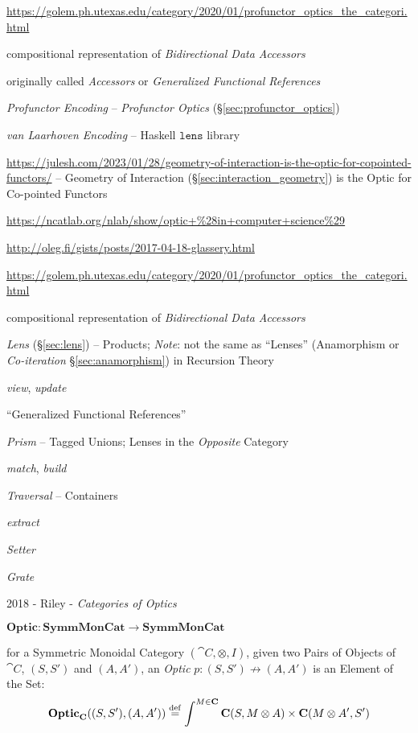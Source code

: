 
\url{https://golem.ph.utexas.edu/category/2020/01/profunctor_optics_the_categori.html}

compositional representation of \emph{Bidirectional Data Accessors}

originally called \emph{Accessors} or \emph{Generalized Functional References}

\emph{Profunctor Encoding} -- \emph{Profunctor Optics}
(\S\ref{sec:profunctor_optics})

\emph{van Laarhoven Encoding} -- Haskell $\mathtt{lens}$ library


\url{https://julesh.com/2023/01/28/geometry-of-interaction-is-the-optic-for-copointed-functors/}
-- Geometry of Interaction (\S\ref{sec:interaction_geometry}) is the Optic for
Co-pointed Functors

\url{https://ncatlab.org/nlab/show/optic+%28in+computer+science%29}

\url{http://oleg.fi/gists/posts/2017-04-18-glassery.html}

\url{https://golem.ph.utexas.edu/category/2020/01/profunctor_optics_the_categori.html}

compositional representation of \emph{Bidirectional Data Accessors}

\emph{Lens} (\S\ref{sec:lens}) -- Products; \emph{Note}: not the same as
``Lenses'' (Anamorphism or \emph{Co-iteration} \S\ref{sec:anamorphism}) in
Recursion Theory

\emph{view}, \emph{update}

``Generalized Functional References''

\emph{Prism} -- Tagged Unions; Lenses in the \emph{Opposite} Category

\emph{match}, \emph{build}

\emph{Traversal} -- Containers

\emph{extract}

\emph{Setter}

\emph{Grate}

2018 - Riley - \emph{Categories of Optics}

$\mathbf{Optic} : \mathbf{SymmMonCat} \rightarrow \mathbf{SymmMonCat}$

for a Symmetric Monoidal Category $(\cat{C}, \otimes, I)$, given two Pairs of
Objects of $\cat{C}$, $(S, S')$ and $(A, A')$, an \emph{Optic}
$p : (S, S') \nrightarrow (A, A')$ is an Element of the Set:
\[
  \mathbf{Optic}_\mathbf{C} ((S, S'), (A, A')) \stackrel{\mathrm{def}}=
    \int^{M\in\mathbf{C}} \mathbf{C}(S, M \otimes A) \times \mathbf{C}(M \otimes A', S')
\]

